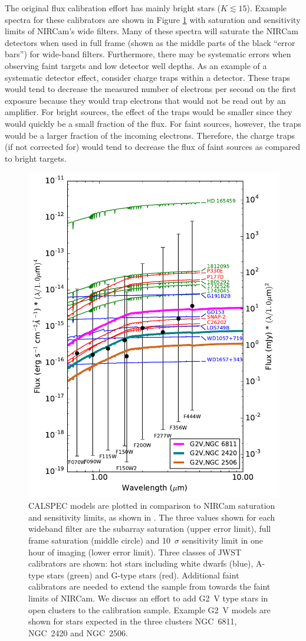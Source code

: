 \documentclass{aastex6}
\begin{document}
The original flux calibration effort has mainly bright stars ($K \lesssim 15$).
Example spectra for these calibrators are shown in Figure \ref{fig:JWSTcalsWideF} with saturation and sensitivity limits of NIRCam's wide filters.
Many of these spectra will saturate the NIRCam detectors when used in full frame (shown as the middle parts of the black ``error bars'') for wide-band filters.
Furthermore, there may be systematic errors when observing faint targets and low detector well depths.
As an example of a systematic detector effect, consider charge traps within a detector.
These traps would tend to decrease the measured number of electrons per second on the first exposure because they would trap electrons  that would not be read out by an amplifier.
For bright sources, the effect of the traps would be smaller since they would quickly be a small fraction of the flux.
For faint sources, however, the traps would be a larger fraction of the incoming electrons.
Therefore, the charge traps (if not corrected for) would tend to decrease the flux of faint sources as compared to bright targets.

\begin{figure}[!hbtp]
\centering
\includegraphics[width=.48\columnwidth]{calspec_and_new_clust.pdf}
\caption{CALSPEC models are plotted in comparison to NIRCam saturation and sensitivity limits, as shown in \citet{gordon2011fluxplan2}.
The three values shown for each wideband filter are the subarray saturation (upper error limit), full frame saturation (middle circle) and 10~$\sigma$ sensitivity limit in one hour of imaging (lower error limit).
Three classes of JWST calibrators are shown: hot stars including white dwarfs (blue), A-type stars (green) and G-type stars (red).
Additional faint calibrators are needed to extend the sample from \citet{gordon2011fluxplan2} towards the faint limits of NIRCam.
We discuss an effort to add G2~V type stars in open clusters to the calibration sample.
Example G2~V \citet{castelli2004models} models are shown for stars expected in the three clusters NGC~6811, NGC~2420 and NGC~2506.
}\label{fig:JWSTcalsWideF}
\end{figure}
\end{document}
